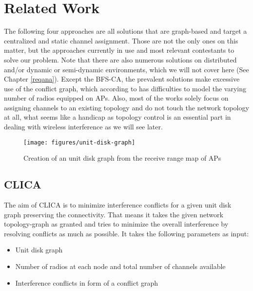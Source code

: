 \chapter{Related Work}
  The following four approaches are all solutions that are graph-based and target a centralized and static channel assignment.
  Those are not the only ones on this matter, but the approaches currently in use and most relevant contestants to solve our problem.
  Note that there are also numerous solutions on distributed and/or dynamic or semi-dynamic environments, which we will not cover here (See Chapter \ref{reqana}).
  Except the \ac{BFS-CA}, the prevalent solutions make excessive use of the conflict graph, which according to \cite{overview_caa} has difficulties to model 
  the varying number of radios equipped on APs. Also, most of the works solely focus on assigning channels to an existing topology and do not touch 
  the network topology at all, what seems like a handicap as topology control is an essential part in dealing with wireless interference as we will see later.
  
  \begin{figure}[h!]
    \centering
    \texttt{[image: figures/unit-disk-graph]}
    \caption{Creation of an unit disk graph from the receive range map of APs}
    \label{fig:unit-disk-graph}
  \end{figure}
  
  \section{\ac{CLICA}}
    The aim of \ac{CLICA} \cite{CLICA} is to minimize interference conflicts for a given unit disk graph preserving the connectivity.
    That means it takes the given network topology-graph as granted and tries to minimize the overall interference by resolving conflicts as much as possible.
    It takes the following parameters as input:
    
    \begin{itemize}
      \item Unit disk graph
      
      \item Number of radios at each node and total number of channels available
      
      \item Interference conflicts in form of a conflict graph
    \end{itemize}
    
